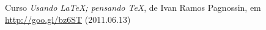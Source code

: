 \begin{thebibliography}{--}
	 Curso \textsl{Usando \LaTeX; pensando \TeX}, de Ivan Ramos Pagnossin, em \url{http://goo.gl/bz6ST} (2011.06.13)
\end{thebibliography}